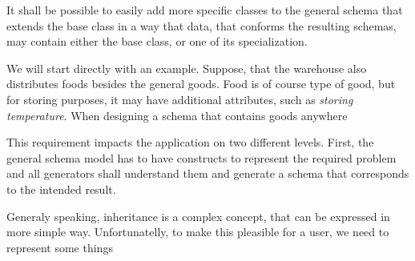 
\begin{requirement}
    It shall be possible to easily add more specific classes to the general schema that extends the base class in a way that data, that conforms the resulting schemas, may contain either the base class, or one of its specialization.
\end{requirement}

\begin{showcase}
    We will start directly with an example. Suppose, that the warehouse also distributes foods besides the general goods. Food is of course type of good, but for storing purposes, it may have additional attributes, such as \textit{storing temperature}. When designing a schema that contains goods anywhere


\end{showcase}

This requirement impacts the application on two different levels. First, the general schema model has to have constructs to represent the required problem and all generators shall understand them and generate a schema that corresponds to the intended result.

Generaly speaking, inheritance is a complex concept, that can be expressed in more simple way. Unfortunatelly, to make this pleasible for a user, we need to represent some things %

